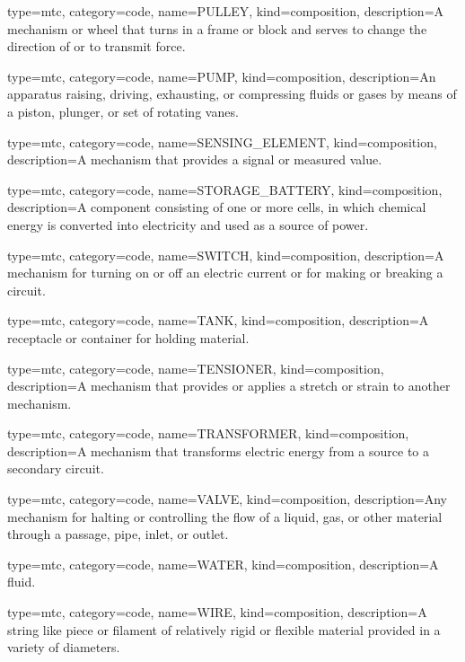 {
  type=mtc,
  category=code,
  name={PULLEY},
  kind={composition},
  description={A mechanism or wheel that turns in a frame or block and serves to change the direction of or to transmit force.}
}


{
  type=mtc,
  category=code,
  name={PUMP},
  kind={composition},
  description={An apparatus raising, driving, exhausting, or compressing fluids or gases by means of a piston, plunger, or set of rotating vanes.}
}


{
  type=mtc,
  category=code,
  name={SENSING\_ELEMENT},
  kind={composition},
  description={A mechanism that provides a signal or measured value.}
}


{
  type=mtc,
  category=code,
  name={STORAGE\_BATTERY},
  kind={composition},
  description={A component consisting of one or more cells, in which chemical energy is converted into electricity and used as a source of power. }
}


{
  type=mtc,
  category=code,
  name={SWITCH},
  kind={composition},
  description={A mechanism for turning on or off an electric current or for making or breaking a circuit.}
}


{
  type=mtc,
  category=code,
  name={TANK},
  kind={composition},
  description={A receptacle or container for holding material.}
}


{
  type=mtc,
  category=code,
  name={TENSIONER},
  kind={composition},
  description={A mechanism that provides or applies a stretch or strain to another mechanism.}
}


{
  type=mtc,
  category=code,
  name={TRANSFORMER},
  kind={composition},
  description={A mechanism that transforms electric energy from a source to a secondary circuit.}
}


{
  type=mtc,
  category=code,
  name={VALVE},
  kind={composition},
  description={Any mechanism for halting or controlling the flow of a liquid, gas, or other material through a passage, pipe, inlet, or outlet.}
}


{
  type=mtc,
  category=code,
  name={WATER},
  kind={composition},
  description={A fluid.}
}


{
  type=mtc,
  category=code,
  name={WIRE},
  kind={composition},
  description={A string like piece or filament of relatively rigid or flexible material provided in a variety of diameters.}
}


